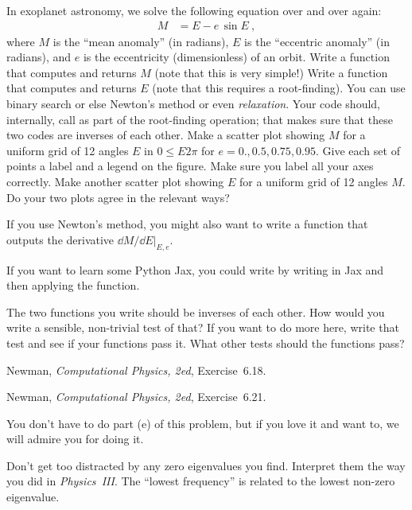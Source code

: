 \documentclass[12pt]{article}
\begin{document}
\begin{problem}
  In exoplanet astronomy, we solve the following equation over and over again:
  \begin{align}
    M &= E - e\,\sin E ~,
  \end{align}
  where $M$ is the ``mean anomaly'' (in radians),
  $E$ is the ``eccentric anomaly'' (in radians),
  and $e$ is the eccentricity (dimensionless) of an orbit.
  \subpart
  Write a function  that computes and returns $M$ (note that this is very simple!)
  \subpart
  Write a function  that computes and returns $E$ (note that this requires a root-finding).
  You can use binary search or else Newton's method or even \emph{relaxation}.
  Your code should, internally, call  as part of the root-finding operation; that makes sure that these two codes are inverses of each other.
  \subpart
  Make a scatter plot showing $M$ for a uniform grid of 12 angles $E$ in $0\leq E 2\pi$ for $e=0., 0.5, 0.75, 0.95$.
  Give each set of points a label and a legend on the figure.
  Make sure you label all your axes correctly.
  \subpart
  Make another scatter plot showing $E$ for a uniform grid of 12 angles $M$.
  Do your two plots agree in the relevant ways?
\end{problem}

\begin{note}
  If you use Newton's method, you might also want to write a function  that outputs the derivative $\left.\dd M/\dd E\right|_{E,e}$.
\end{note}

\begin{note}
  If you want to learn some Python Jax, you could write  by writing  in Jax and then applying the  function.
\end{note}

\begin{note}
  The two functions you write should be inverses of each other.
  How would you write a sensible, non-trivial test of that?
  If you want to do more here, write that test and see if your functions pass it.
  What other tests should the functions pass?
\end{note}

\begin{problem}
  Newman, \textit{Computational Physics, 2ed}, Exercise~6.18.
\end{problem}

\begin{problem}
  Newman, \textit{Computational Physics, 2ed}, Exercise~6.21.
\end{problem}

\begin{note}
  You don't have to do part (e) of this problem, but if you love it and want to, we will admire you for doing it.
\end{note}

\begin{note}
  Don't get too distracted by any zero eigenvalues you find.
  Interpret them the way you did in \textsl{Physics~III}.
  The ``lowest frequency'' is related to the lowest non-zero eigenvalue.
\end{note}
\end{document}

